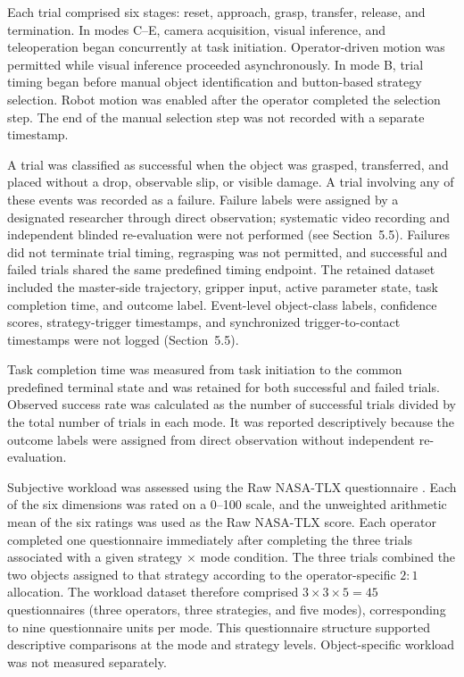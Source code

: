 Each trial comprised six stages: reset, approach, grasp, transfer, release, and termination. In modes C--E, camera acquisition, visual inference, and teleoperation began concurrently at task initiation. Operator-driven motion was permitted while visual inference proceeded asynchronously. In mode B, trial timing began before manual object identification and button-based strategy selection. Robot motion was enabled after the operator completed the selection step. The end of the manual selection step was not recorded with a separate timestamp.

A trial was classified as successful when the object was grasped, transferred, and placed without a drop, observable slip, or visible damage. A trial involving any of these events was recorded as a failure. Failure labels were assigned by a designated researcher through direct observation; systematic video recording and independent blinded re-evaluation were not performed (see Section~5.5). Failures did not terminate trial timing, regrasping was not permitted, and successful and failed trials shared the same predefined timing endpoint. The retained dataset included the master-side trajectory, gripper input, active parameter state, task completion time, and outcome label. Event-level object-class labels, confidence scores, strategy-trigger timestamps, and synchronized trigger-to-contact timestamps were not logged (Section~5.5).

Task completion time was measured from task initiation to the common predefined terminal state and was retained for both successful and failed trials. Observed success rate was calculated as the number of successful trials divided by the total number of trials in each mode. It was reported descriptively because the outcome labels were assigned from direct observation without independent re-evaluation.

Subjective workload was assessed using the Raw NASA-TLX questionnaire \cite{ref27}. Each of the six dimensions was rated on a 0--100 scale, and the unweighted arithmetic mean of the six ratings was used as the Raw NASA-TLX score. Each operator completed one questionnaire immediately after completing the three trials associated with a given strategy $\times$ mode condition. The three trials combined the two objects assigned to that strategy according to the operator-specific $2{:}1$ allocation. The workload dataset therefore comprised $3 \times 3 \times 5 = 45$ questionnaires (three operators, three strategies, and five modes), corresponding to nine questionnaire units per mode. This questionnaire structure supported descriptive comparisons at the mode and strategy levels. Object-specific workload was not measured separately.

